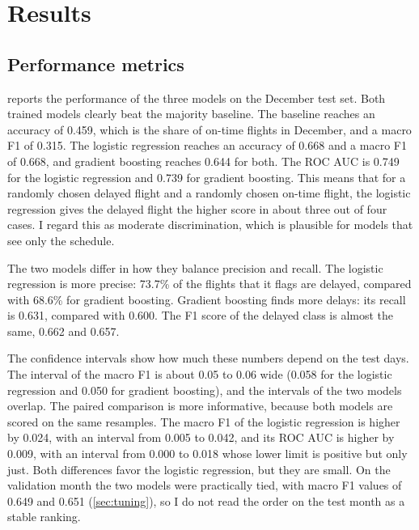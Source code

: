 \section{Results}\label{sec:results}

\subsection{Performance metrics}\label{sec:metrics}

 reports the performance of the three models on the December test set. Both trained models clearly beat the majority baseline. The baseline reaches an accuracy of 0.459, which is the share of on-time flights in December, and a macro F1 of 0.315. The logistic regression reaches an accuracy of 0.668 and a macro F1 of 0.668, and gradient boosting reaches 0.644 for both. The ROC AUC is 0.749 for the logistic regression and 0.739 for gradient boosting. This means that for a randomly chosen delayed flight and a randomly chosen on-time flight, the logistic regression gives the delayed flight the higher score in about three out of four cases. I regard this as moderate discrimination, which is plausible for models that see only the schedule.



The two models differ in how they balance precision and recall. The logistic regression is more precise: 73.7\% of the flights that it flags are delayed, compared with 68.6\% for gradient boosting. Gradient boosting finds more delays: its recall is 0.631, compared with 0.600. The F1 score of the delayed class is almost the same, 0.662 and 0.657.

The confidence intervals show how much these numbers depend on the test days. The interval of the macro F1 is about 0.05 to 0.06 wide (0.058 for the logistic regression and 0.050 for gradient boosting), and the intervals of the two models overlap. The paired comparison is more informative, because both models are scored on the same resamples. The macro F1 of the logistic regression is higher by 0.024, with an interval from 0.005 to 0.042, and its ROC AUC is higher by 0.009, with an interval from 0.000 to 0.018 whose lower limit is positive but only just. Both differences favor the logistic regression, but they are small. On the validation month the two models were practically tied, with macro F1 values of 0.649 and 0.651 (\cref{sec:tuning}), so I do not read the order on the test month as a stable ranking.

